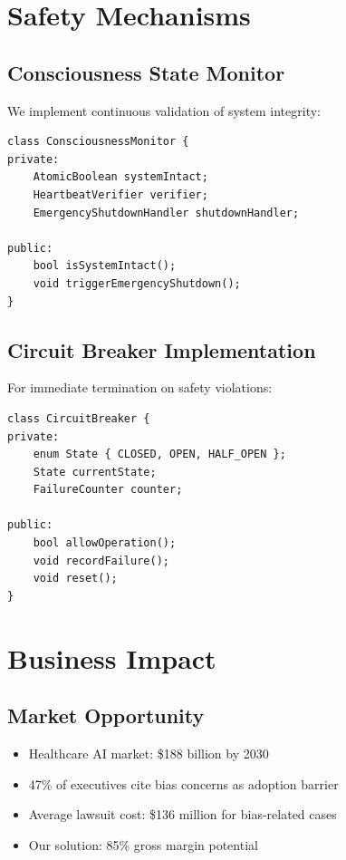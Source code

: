 \documentclass[11pt,a4paper]{article}
\theoremstyle{plain}
\theoremstyle{definition}
\theoremstyle{remark}
\begin{document}
\section{Safety Mechanisms}

\subsection{Consciousness State Monitor}

We implement continuous validation of system integrity:

\begin{verbatim}
class ConsciousnessMonitor {
private:
    AtomicBoolean systemIntact;
    HeartbeatVerifier verifier;
    EmergencyShutdownHandler shutdownHandler;
    
public:
    bool isSystemIntact();
    void triggerEmergencyShutdown();
}
\end{verbatim}

\subsection{Circuit Breaker Implementation}

For immediate termination on safety violations:

\begin{verbatim}
class CircuitBreaker {
private:
    enum State { CLOSED, OPEN, HALF_OPEN };
    State currentState;
    FailureCounter counter;
    
public:
    bool allowOperation();
    void recordFailure();
    void reset();
}
\end{verbatim}

\section{Business Impact}

\subsection{Market Opportunity}
\begin{itemize}
    \item Healthcare AI market: \$188 billion by 2030
    \item 47\% of executives cite bias concerns as adoption barrier
    \item Average lawsuit cost: \$136 million for bias-related cases
    \item Our solution: 85\% gross margin potential
\end{itemize}
\end{document}
